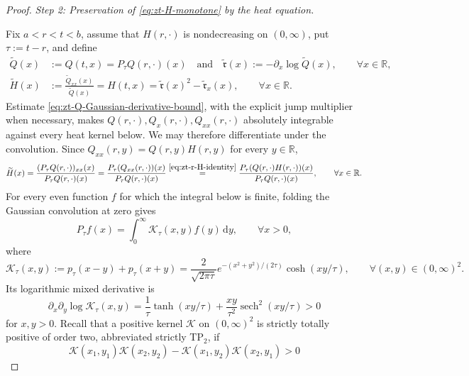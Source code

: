 \documentclass[10pt]{amsart}
\theoremstyle{definition}
\theoremstyle{remark}
\numberwithin{equation}{section}
\newcommand{\R}{\mathbb R}
\newcommand{\1}{\mathbf 1}
\newcommand{\sech}{\operatorname{sech}}
\newcommand{\dd}{\,\mathrm d}
\newcommand{\stackref}[2]{\stackrel{#2}{#1}}
\begin{document}
\begin{proof}
\smallskip
\noindent\emph{Step 2: Preservation of \eqref{eq:zt-H-monotone} by the heat equation.}

Fix $a<r<t<b$, assume that $H(r,\cdot)$ is nondecreasing on $(0,\infty)$, put $\tau:=t-r$, and define
\begin{align*}
 \widetilde Q(x)&:=Q(t,x)=P_\tau Q(r,\cdot)(x)\quad\text{and}\quad
 \widetilde{\mathfrak r}(x):=-\partial_x\log\widetilde Q(x),
 \qquad \forall x\in\R,\\
 \widetilde H(x)&:=\frac{\widetilde Q_{xx}(x)}{\widetilde Q(x)}=H(t,x)
 =\widetilde{\mathfrak r}(x)^2-\widetilde{\mathfrak r}_x(x),
 \qquad \forall x\in\R.
\end{align*}
Estimate \eqref{eq:zt-Q-Gaussian-derivative-bound}, with the explicit jump multiplier when necessary, makes $Q(r,\cdot),Q_x(r,\cdot),Q_{xx}(r,\cdot)$ absolutely integrable against every heat kernel below. We may therefore differentiate under the convolution. Since $Q_{xx}(r,y)=Q(r,y)H(r,y)$ for every $y\in\R$,
\begin{equation}
 \widetilde H(x)=\frac{(P_\tau Q(r,\cdot))_{xx}(x)}{P_\tau Q(r,\cdot)(x)}
 =\frac{P_\tau(Q_{xx}(r,\cdot))(x)}{P_\tau Q(r,\cdot)(x)}
 \stackref{=}{\eqref{eq:zt-r-H-identity}}
 \frac{P_\tau(Q(r,\cdot)H(r,\cdot))(x)}{P_\tau Q(r,\cdot)(x)},
 \qquad \forall x\in\R.
 \label{eq:zt-H-heat-ratio}
\end{equation}
For every even function $f$ for which the integral below is finite, folding the Gaussian convolution at zero gives
\begin{equation*}
 P_\tau f(x)=\int_0^\infty\mathcal K_\tau(x,y)f(y)\dd y,
 \qquad \forall x>0,
\end{equation*}
where
\begin{equation*}
 \mathcal K_\tau(x,y):=p_\tau(x-y)+p_\tau(x+y)
 =\frac{2}{\sqrt{2\pi\tau}}e^{-(x^2+y^2)/(2\tau)}\cosh(xy/\tau),
 \qquad \forall (x,y)\in(0,\infty)^2.
\end{equation*}
Its logarithmic mixed derivative is
\begin{equation*}
 \partial_x\partial_y\log\mathcal K_\tau(x,y)
 =\frac1\tau\tanh(xy/\tau)+\frac{xy}{\tau^2}\sech^2(xy/\tau)>0
\end{equation*}
for $x,y>0$. Recall that a positive kernel $\mathcal K$ on $(0,\infty)^2$ is strictly totally positive of order two, abbreviated strictly TP$_2$, if
\begin{equation}
 \mathcal K(x_1,y_1)\mathcal K(x_2,y_2)
 -\mathcal K(x_1,y_2)\mathcal K(x_2,y_1)>0
 \label{eq:zt-strict-TP2-definition}
\end{equation}

\end{proof}
\end{document}

